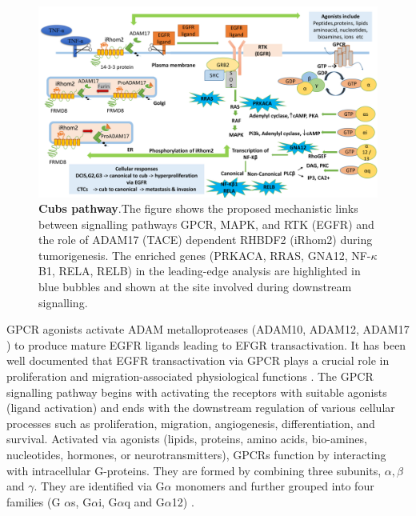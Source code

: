 \documentclass[fleqn,10pt,lineno]{wlpeerj}
\begin{document}
\begin{figure}[ht] %
\centering
\captionsetup{justification=centering}
\vspace{.5cm} %
\begin{flushright}
\includegraphics[width=150mm]{Figure6.pdf}
\caption{\textbf{Cubs pathway}.The figure shows the proposed mechanistic links between signalling pathways GPCR, MAPK, and RTK (EGFR) and the role of ADAM17 (TACE) dependent RHBDF2 (iRhom2) during tumorigenesis. The enriched genes (PRKACA, RRAS, GNA12, NF-$\kappa$B1, RELA, RELB) in the leading-edge analysis are highlighted in blue bubbles and shown at the site involved during downstream signalling.  
\label{fig6}} %
\end{flushright}
\end{figure}

GPCR agonists activate ADAM metalloproteases (ADAM10, ADAM12, ADAM17 ) to produce mature EGFR ligands leading to EFGR transactivation. It has been well documented that EGFR transactivation via GPCR plays a crucial role in proliferation and migration-associated physiological functions \citep{Prenzel1999,Wang2016}. The GPCR signalling pathway begins with activating the receptors with suitable agonists (ligand activation) and ends with the downstream regulation of various cellular processes such as proliferation, migration, angiogenesis, differentiation, and survival. Activated via agonists (lipids, proteins, amino acids, bio-amines, nucleotides, hormones, or neurotransmitters), GPCRs function by interacting with intracellular G-proteins. They are formed by combining three subunits, $\alpha, \beta$ and $\gamma$. They are identified via G$\alpha$ monomers and further grouped into four families (G $\alpha$s, G$\alpha$i, G$\alpha$q and G$\alpha$12) \citep{Smrcka2008,Senarath2018,Weis2018,Wu2020}.
 
\end{document}
